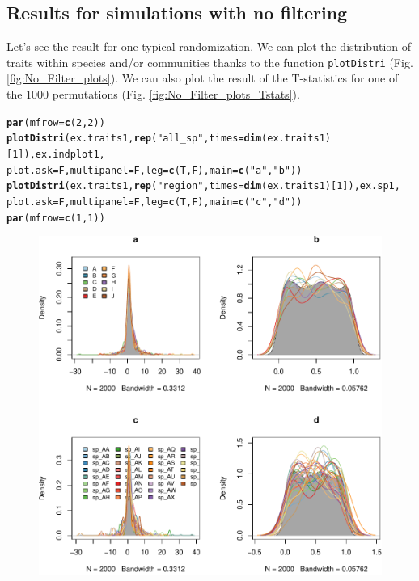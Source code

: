 \documentclass[12pt]{article}\usepackage[]{graphicx}\usepackage[]{color}
\makeatletter
\def\maxwidth{ %
  \ifdim\Gin@nat@width>\linewidth
    \linewidth
  \else
    \Gin@nat@width
  \fi
}
\newcommand{\hlnum}[1]{\textcolor[rgb]{0.686,0.059,0.569}{#1}}%
\newcommand{\hlstr}[1]{\textcolor[rgb]{0.192,0.494,0.8}{#1}}%
\newcommand{\hlstd}[1]{\textcolor[rgb]{0.345,0.345,0.345}{#1}}%
\newcommand{\hlkwc}[1]{\textcolor[rgb]{0.333,0.667,0.333}{#1}}%
\newcommand{\hlkwd}[1]{\textcolor[rgb]{0.737,0.353,0.396}{\textbf{#1}}}%
\newenvironment{kframe}{%
 \def\at@end@of@kframe{}%
 \ifinner\ifhmode%
  \def\at@end@of@kframe{\end{minipage}}%
  \begin{minipage}{\columnwidth}%
 \fi\fi%
 \def\FrameCommand##1{\hskip\@totalleftmargin \hskip-\fboxsep
 \colorbox{shadecolor}{##1}\hskip-\fboxsep
     \hskip-\linewidth \hskip-\@totalleftmargin \hskip\columnwidth}%
 \MakeFramed {\advance\hsize-\width
   \@totalleftmargin\z@ \linewidth\hsize
   \@setminipage}}%
 {\par\unskip\endMakeFramed%
 \at@end@of@kframe}
\newenvironment{knitrout}{}{} %
\makeatother
\begin{document}
  \subsection {Results for simulations with no filtering}
Let's see the result for one typical randomization. We can plot the distribution of traits within species and/or communities thanks to the function \texttt{plotDistri} (Fig. \ref{fig:No_Filter_plots}). We can also plot the result of the T-statistics for one of the 1000 permutations (Fig. \ref{fig:No_Filter_plots_Tstats}).

\begin{knitrout}\small
{}\color{fgcolor}\begin{kframe}
\begin{alltt}
\hlkwd{par}\hlstd{(}\hlkwc{mfrow}\hlstd{=}\hlkwd{c}\hlstd{(}\hlnum{2}\hlstd{,} \hlnum{2}\hlstd{))}
\hlkwd{plotDistri}\hlstd{(ex.traits1,} \hlkwd{rep}\hlstd{(}\hlstr{"all_sp"}\hlstd{,} \hlkwc{times} \hlstd{=} \hlkwd{dim}\hlstd{(ex.traits1)[}\hlnum{1}\hlstd{]), ex.indplot1,}
           \hlkwc{plot.ask} \hlstd{= F,} \hlkwc{multipanel} \hlstd{= F,} \hlkwc{leg} \hlstd{=}\hlkwd{c}\hlstd{(T, F),} \hlkwc{main} \hlstd{=} \hlkwd{c}\hlstd{(}\hlstr{"a"}\hlstd{,} \hlstr{"b"}\hlstd{))}
\hlkwd{plotDistri}\hlstd{(ex.traits1,} \hlkwd{rep}\hlstd{(}\hlstr{"region"}\hlstd{,} \hlkwc{times} \hlstd{=} \hlkwd{dim}\hlstd{(ex.traits1)[}\hlnum{1}\hlstd{]), ex.sp1,}
           \hlkwc{plot.ask} \hlstd{= F,} \hlkwc{multipanel} \hlstd{= F,} \hlkwc{leg} \hlstd{=}\hlkwd{c}\hlstd{(T, F),} \hlkwc{main} \hlstd{=} \hlkwd{c}\hlstd{(}\hlstr{"c"}\hlstd{,} \hlstr{"d"}\hlstd{))}
\hlkwd{par}\hlstd{(}\hlkwc{mfrow}\hlstd{=}\hlkwd{c}\hlstd{(}\hlnum{1}\hlstd{,} \hlnum{1}\hlstd{))}
\end{alltt}
\end{kframe}\begin{figure}

{\centering \includegraphics[width=\maxwidth]{figure/No_Filter_plots-1} 

}
\end{figure}
\end{knitrout}
\end{document}
